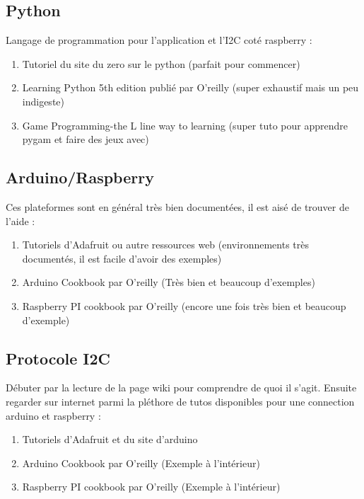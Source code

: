 \documentclass[fleqn,10pt]{SelfArx} %
\begin{document}
\subsection{Python}

Langage de programmation pour l'application et l'I2C coté raspberry :
\begin{enumerate}[noitemsep] %
	\item Tutoriel du site du zero sur le python (parfait pour commencer)
	\item Learning Python 5th edition publié par O'reilly (super exhaustif mais un peu indigeste)
	\item Game Programming-the L line way to learning (super tuto pour apprendre pygam et faire des jeux avec)
\end{enumerate}

\subsection{Arduino/Raspberry}

Ces plateformes sont en général très bien documentées, il est aisé de trouver de l'aide :
\begin{enumerate}[noitemsep] %
	\item Tutoriels d'Adafruit ou autre ressources web (environnements très documentés, il est facile d'avoir des exemples)
	\item Arduino Cookbook par O'reilly (Très bien et beaucoup d'exemples)
	\item Raspberry PI cookbook par O'reilly (encore une fois très bien et beaucoup d'exemple)
\end{enumerate}

\subsection{Protocole I2C}
Débuter par la lecture de la page wiki pour comprendre de quoi il s'agit. Ensuite regarder sur internet parmi la pléthore de tutos disponibles pour une connection arduino et raspberry :

\begin{enumerate}[noitemsep] %
	\item Tutoriels d'Adafruit et du site d'arduino
	\item Arduino Cookbook par O'reilly (Exemple à l'intérieur)
	\item Raspberry PI cookbook par O'reilly (Exemple à l'intérieur)
\end{enumerate}
\end{document}
